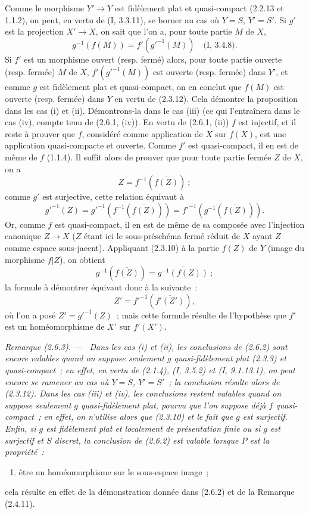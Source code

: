 \documentclass[10pt,oneside]{book}
\newcommand{\oldpage}[2][]{%
  \setcounter{footnote}{0}%
  \marginpar{\scriptsize\textbf{#1}~|~#2}\ignorespaces}
\newenvironment{remark}[1][]{%
  \par\medskip\noindent\itshape Remarque (#1). ---\ }{\par}
\begin{document}
\oldpage[IV-2]{28}
Comme le morphisme $Y'\to Y$ est fidèlement plat et quasi-compact (2.2.13 et
1.1.2), on peut, en vertu de (I, 3.3.11), se borner au cas où $Y=S$,
$Y'=S'$. Si $g'$ est la projection $X'\to X$, on sait que l'on a, pour toute
partie $M$ de $X$,
\[
g^{-1}(f(M))=f'(g'^{-1}(M))\quad\text{(I, 3.4.8).}
\]
Si $f'$ est un morphisme ouvert (resp. fermé) alors, pour toute partie
ouverte (resp. fermée) $M$ de $X$, $f'(g'^{-1}(M))$ est ouverte (resp.
fermée) dans $Y'$, et comme $g$ est fidèlement plat et quasi-compact, on en
conclut que $f(M)$ est ouverte (resp. fermée) dans $Y$ en vertu de (2.3.12).
Cela démontre la proposition dans les cas (i) et (ii). Démontrons-la dans le
cas (iii) (ce qui l'entraînera dans le cas (iv), compte tenu de (2.6.1,
(iv)). En vertu de (2.6.1, (ii)) $f$ est injectif, et il reste à prouver que
$f$, considéré comme application de $X$ sur $f(X)$, est une application
quasi-compacte et ouverte. Comme $f'$ est quasi-compact, il en est de même de
$f$ (1.1.4). Il suffit alors de prouver que pour toute partie fermée $Z$ de
$X$, on a
\[
Z=f^{-1}(\overline{f(Z)})~;
\]
comme $g'$ est surjective, cette relation équivaut à
\[
g'^{-1}(Z)=g'^{-1}(f^{-1}(\overline{f(Z)}))
=f'^{-1}(g^{-1}(\overline{f(Z)})).
\]
Or, comme $f$ est quasi-compact, il en est de même de sa composée avec
l'injection canonique $Z\to X$ ($Z$ étant ici le sous-préschéma fermé réduit
de $X$ ayant $Z$ comme espace sous-jacent). Appliquant (2.3.10) à la partie
$f(Z)$ de $Y$ (image du morphisme $f|Z$), on obtient
\[
g^{-1}(\overline{f(Z)})=\overline{g^{-1}(f(Z))}~;
\]
la formule à démontrer équivaut donc à la suivante~:
\[
Z'=f'^{-1}(\overline{f'(Z')}),
\]
où l'on a posé $Z'=g'^{-1}(Z)$~; mais cette formule résulte de l'hypothèse
que $f'$ est un homéomorphisme de $X'$ sur $f'(X')$.

\begin{remark}[2.6.3]
\label{IV.2.6.3-fr}
Dans les cas (i) et (ii), les conclusions de (2.6.2) sont encore valables
quand on suppose seulement $g$ quasi-fidèlement plat (2.3.3) et
quasi-compact~; en effet, en vertu de (2.1.4), (I, 3.5.2) et
(I, 9.1.13.1), on peut encore se ramener au cas où $Y=S$, $Y'=S'$~; la
conclusion résulte alors de (2.3.12). Dans les cas (iii) et (iv), les
conclusions restent valables quand on suppose seulement $g$ quasi-fidèlement
plat, pourvu que l'on suppose déjà $f$ quasi-compact~; en effet, on n'utilise
alors que (2.3.10) et le fait que $g$ est surjectif. Enfin, si $g$ est
fidèlement plat et localement de présentation finie ou si $g$ est surjectif
et $S$ discret, la conclusion de (2.6.2) est valable lorsque $P$ est la
propriété~:
\begin{enumerate}
\item[(iii \emph{bis})] être un homéomorphisme sur le sous-espace image~;
\end{enumerate}
cela résulte en effet de la démonstration donnée dans (2.6.2) et de la
Remarque (2.4.11).
\end{remark}
\end{document}
